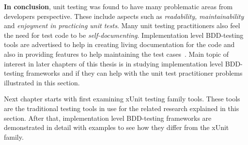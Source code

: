     \textbf{In conclusion}, unit testing was found to have many problematic areas from developers perspective.
    These include aspects such as \textit{readability,
    maintainability} and \textit{enjoyment in practicing unit tests}. Many unit testing practitioners also feel the need for
    test code to be \textit{self-documenting}. Implementation level BDD-testing tools are advertised to
    help in creating living documentation for the code and also in providing features to help maintaining the test cases~\cite{smart2014bdd}.
    Main topic of interest in later chapters of this thesis is in studying implementation level BDD-testing frameworks and
    if they can help with the unit test practitioner problems illustrated in this section.

    Next chapter starts with first examining xUnit testing family tools. These tools are the traditional testing tools in use for the
    related research explained in this section. After that, implementation level BDD-testing frameworks are demonstrated in detail
    with examples to see how they differ from the xUnit family.




